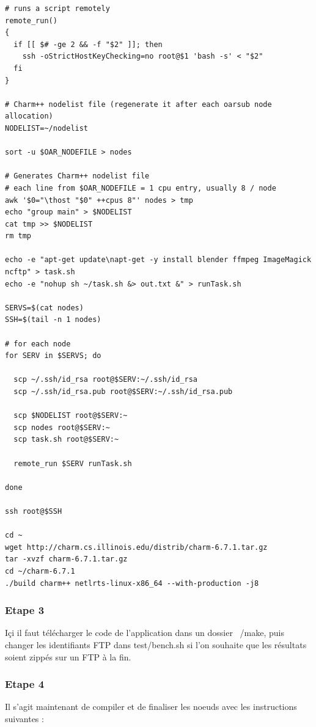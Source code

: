 \documentclass[a4paper, 11pt, titlepage]{article}
\begin{document}
\begin{verbatim}
# runs a script remotely
remote_run()
{
  if [[ $# -ge 2 && -f "$2" ]]; then
    ssh -oStrictHostKeyChecking=no root@$1 'bash -s' < "$2"
  fi
}

# Charm++ nodelist file (regenerate it after each oarsub node allocation)
NODELIST=~/nodelist

sort -u $OAR_NODEFILE > nodes

# Generates Charm++ nodelist file
# each line from $OAR_NODEFILE = 1 cpu entry, usually 8 / node
awk '$0="\thost "$0" ++cpus 8"' nodes > tmp
echo "group main" > $NODELIST
cat tmp >> $NODELIST
rm tmp

echo -e "apt-get update\napt-get -y install blender ffmpeg ImageMagick ncftp" > task.sh
echo -e "nohup sh ~/task.sh &> out.txt &" > runTask.sh

SERVS=$(cat nodes)
SSH=$(tail -n 1 nodes)

# for each node
for SERV in $SERVS; do

  scp ~/.ssh/id_rsa root@$SERV:~/.ssh/id_rsa
  scp ~/.ssh/id_rsa.pub root@$SERV:~/.ssh/id_rsa.pub

  scp $NODELIST root@$SERV:~
  scp nodes root@$SERV:~
  scp task.sh root@$SERV:~

  remote_run $SERV runTask.sh

done

ssh root@$SSH

cd ~
wget http://charm.cs.illinois.edu/distrib/charm-6.7.1.tar.gz
tar -xvzf charm-6.7.1.tar.gz
cd ~/charm-6.7.1
./build charm++ netlrts-linux-x86_64 --with-production -j8
\end{verbatim}



\subsubsection {Etape 3}

Içi il faut télécharger le code de l'application dans un dossier ~/make, puis changer les identifiants FTP dans test/bench.sh si l'on souhaite que les résultats soient zippés sur un FTP à la fin.


\subsubsection {Etape 4}

Il s'agit maintenant de compiler et de finaliser les noeuds avec les instructions suivantes :
\end{document}

